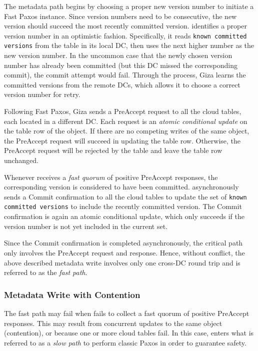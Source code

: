 The metadata path begins by choosing a proper new version number to initiate a 
Fast Paxos instance. Since version numbers need to be consecutive, 
the new version should succeed the most recently committed version.
{\name} identifies a proper version number in an optimistic fashion.
Specifically, it reads {\tt known committed versions} from the table in its local DC,
then uses the next higher number as the new version number.
In the uncommon case that the newly chosen version number has already been committed
(but this DC missed the corresponding commit), the commit attempt would fail.
Through the process, Giza learns the committed versions from the remote DCs,
which allows it to choose a correct version number for retry.

Following Fast Paxos, Giza sends a PreAccept request to all the cloud tables,
each located in a different DC. 
Each request is an {\em atomic conditional update} on the table row of the object.
If there are no competing writes of the same object, the PreAccept request
will succeed in updating the table row. Otherwise, the PreAccept request will be
rejected by the table and leave the table row unchanged. 

Whenever {\name} receives a {\em fast quorum} of positive PreAccept
responses, the corresponding version is considered to have been committed.
{\name} asynchronously sends a Commit confirmation to all the cloud tables
to update the set of {\tt known committed versions} to include the recently
committed version. The Commit confirmation is again an atomic conditional
update, which only succeeds if the version number is not yet included in the
current set.

Since the Commit confirmation is completed asynchronously, the critical path
only involves the PreAccept request and response. Hence, without conflict, the
above described metadata write involves only one cross-DC round trip and is
referred to as the {\em fast path}.

\subsubsection{Metadata Write with Contention}

The fast path may fail when {\name} fails to collect a fast quorum of
positive PreAccept responses. This may result from concurrent updates to the
same object (contention), or because one or more cloud tables fail. In this
case, {\name} enters what is referred to as a \emph{slow path} to perform
classic Paxos in order to guarantee safety.

